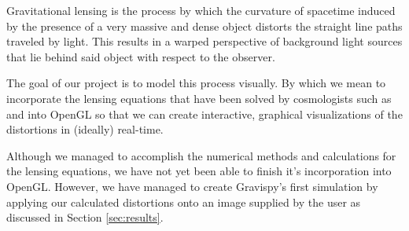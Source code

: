 \documentclass{standalone}
\begin{document}
Gravitational lensing is the process by which the curvature of spacetime induced by the presence of a very massive and dense object distorts the straight line paths traveled by light.
This results in a warped perspective of background light sources that lie behind said object with respect to the observer.

The goal of our project is to model this process visually.
By which we mean to incorporate the lensing equations that have been solved by cosmologists such as \cite[Perlick]{gen_lens} and \cite[Frittelli, et al.]{sc_lens} into OpenGL so that we can create interactive, graphical visualizations of the distortions in (ideally) real-time.

Although we managed to accomplish the numerical methods and calculations for the lensing equations, we have not yet been able to finish it's incorporation into OpenGL.
However, we have managed to create Gravispy's first simulation by applying our calculated distortions onto an image supplied by the user as discussed in Section \ref{sec:results}.
\end{document}
